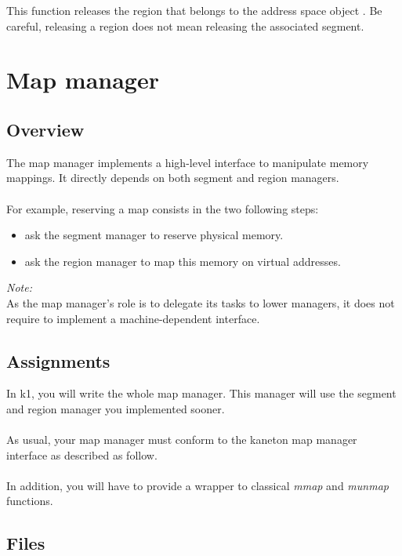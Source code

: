 {
  This function releases the region  that
  belongs to the address space object . Be
  careful, releasing a region does not mean releasing the
  associated segment.
}

%
%

\newpage

\section{Map manager}

\subsection*{Overview}
The map manager implements a high-level interface to manipulate memory mappings.
It directly depends on both segment and region managers.\\
\\
For example, reserving a map consists in the two following steps:
\begin{itemize}
\item ask the segment manager to reserve physical memory.
\item ask the region manager to map this memory on virtual addresses.\\
\end{itemize}

{\em Note:}\\
As the map manager's role is to delegate its tasks to lower managers, it does
not require to implement a machine-dependent interface.

\subsection*{Assignments}
In k1, you will write the whole map manager. This manager will use the segment
and region manager you implemented sooner.\\
\\
As usual, your map manager must conform to the kaneton map manager interface as
described as follow.\\
\\
In addition, you will have to provide a wrapper to classical
\emph{mmap} and \emph{munmap} functions.

\subsection*{Files}

